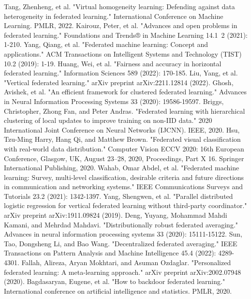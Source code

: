 \documentclass[conference]{IEEEtran}
\begin{document}
\begin{thebibliography}{00}
     Tang, Zhenheng, et al. "Virtual homogeneity learning: Defending against data heterogeneity in federated learning." International Conference on Machine Learning. PMLR, 2022.
     Kairouz, Peter, et al. "Advances and open problems in federated learning." Foundations and Trends® in Machine Learning 14.1~2 (2021): 1-210.
     Yang, Qiang, et al. "Federated machine learning: Concept and applications." ACM Transactions on Intelligent Systems and Technology (TIST) 10.2 (2019): 1-19.
     Huang, Wei, et al. "Fairness and accuracy in horizontal federated learning." Information Sciences 589 (2022): 170-185.
     Liu, Yang, et al. "Vertical federated learning." arXiv preprint arXiv:2211.12814 (2022).
     Ghosh, Avishek, et al. "An efficient framework for clustered federated learning." Advances in Neural Information Processing Systems 33 (2020): 19586-19597.
     Briggs, Christopher, Zhong Fan, and Peter Andras. "Federated learning with hierarchical clustering of local updates to improve training on non-IID data." 2020 International Joint Conference on Neural Networks (IJCNN). IEEE, 2020.
     Hsu, Tzu-Ming Harry, Hang Qi, and Matthew Brown. "Federated visual classification with real-world data distribution." Computer Vision ECCV 2020: 16th European Conference, Glasgow, UK, August 23–28, 2020, Proceedings, Part X 16. Springer International Publishing, 2020.
     Wahab, Omar Abdel, et al. "Federated machine learning: Survey, multi-level classification, desirable criteria and future directions in communication and networking systems." IEEE Communications Surveys and Tutorials 23.2 (2021): 1342-1397.
     Yang, Shengwen, et al. "Parallel distributed logistic regression for vertical federated learning without third-party coordinator." arXiv preprint arXiv:1911.09824 (2019).
     Deng, Yuyang, Mohammad Mahdi Kamani, and Mehrdad Mahdavi. "Distributionally robust federated averaging." Advances in neural information processing systems 33 (2020): 15111-15122.
     Sun, Tao, Dongsheng Li, and Bao Wang. "Decentralized federated averaging." IEEE Transactions on Pattern Analysis and Machine Intelligence 45.4 (2022): 4289-4301.
     Fallah, Alireza, Aryan Mokhtari, and Asuman Ozdaglar. "Personalized federated learning: A meta-learning approach." arXiv preprint arXiv:2002.07948 (2020).
     Bagdasaryan, Eugene, et al. "How to backdoor federated learning." International conference on artificial intelligence and statistics. PMLR, 2020.

\end{thebibliography}
\end{document}
